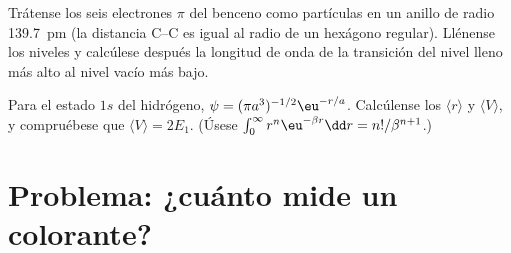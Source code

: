 \begin{exercise}[$\star\star\star$]\label{exo:b3:quantum-model-systems:11}
Trátense los seis electrones $\pi$ del benceno como partículas en un anillo de radio
\qty{139.7}{pm} (la distancia C--C es igual al radio de un hexágono regular).
Llénense los niveles y calcúlese después la longitud de onda de la transición del
nivel lleno más alto al nivel vacío más bajo.
\end{exercise}

\begin{exercise}[$\star\star\star$]\label{exo:b3:quantum-model-systems:12}
Para el estado $1s$ del hidrógeno, $\psi = (\pi a^3)^{-1/2}\eu^{-r/a}$. Calcúlense los
 $\langle r\rangle$ y $\langle V\rangle$, y compruébese que
$\langle V\rangle = 2E_1$. (Úsese $\int_0^\infty r^n\eu^{-\beta r}\dd r =
n!/\beta^{n+1}$.)
\end{exercise}

\section{Problema: ¿cuánto mide un colorante?}

